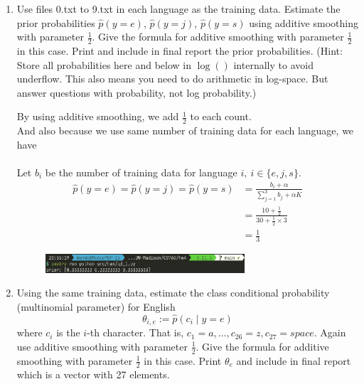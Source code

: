 \documentclass[a4paper]{article}
\theoremstyle{definition}
\newenvironment{soln}{
    \leavevmode\color{blue}\ignorespaces
}{}
\begin{document}
\begin{enumerate}
	\item
	      Use files 0.txt to 9.txt in each language as the training data.
	      Estimate the prior probabilities
	      $\hat p(y=e)$,
	      $\hat p(y=j)$,
	      $\hat p(y=s)$
	      using additive smoothing with parameter $\frac{1}{2}$.
	      Give the formula for additive smoothing with parameter $\frac{1}{2}$ in this case.
	      Print and include in final report the prior probabilities.
	      (Hint: Store all probabilities here and below in $\log()$ internally to avoid underflow. This also means you need to do arithmetic in log-space.  But answer questions with probability, not log probability.)

	      \begin{soln}
		      By using additive smoothing, we add $\frac{1}{2}$ to each count.\\
		      And also because we use same number of training data for each language, we have\\\\
		      Let $b_i$ be the number of training data for language $i,\ i \in \{e, j, s\}$.
		      \begin{align*}
			      \hat p(y=e) = \hat p(y=j)= \hat p(y=s) & = \frac{b_i + \alpha}{\sum_{j=1}^{3}b_j + \alpha K} \\
			                                             & =  \frac{10+\frac{1}{2}}{30 + \frac{1}{2} \times 3} \\
			                                             & = \frac{1}{3}
		      \end{align*}
		      \begin{figure}[h]
			      \centering
			      \includegraphics[width=0.7\textwidth]{img/q3_1.png}
		      \end{figure}
	      \end{soln}

	\item
	      Using the same training data, estimate the class conditional probability (multinomial parameter) for English
	      $$\theta_{i,e} := \hat p(c_i \mid y=e)$$
	      where $c_i$ is the $i$-th character. That is, $c_1 = a, \ldots, c_{26} = z, c_{27} = space$.
	      Again use additive smoothing with parameter $\frac{1}{2}$.
	      Give the formula for additive smoothing with parameter $\frac{1}{2}$ in this case.
	      Print $\theta_e$ and include in final report which is a vector with 27 elements.


\end{enumerate}
\end{document}
